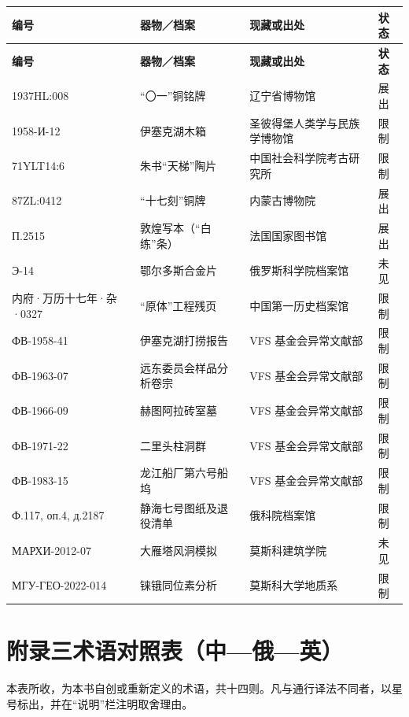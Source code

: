 \vspace{2mm}
{\footnotesize
\renewcommand{\arraystretch}{1.0}
\begin{longtable}{@{}p{27mm}p{40mm}p{36mm}p{24mm}@{}}
\toprule
\textbf{编号} & \textbf{器物／档案} & \textbf{现藏或出处} & \textbf{状态}\\
\midrule
\endfirsthead
\toprule
\textbf{编号} & \textbf{器物／档案} & \textbf{现藏或出处} & \textbf{状态}\\
\midrule
\endhead
\bottomrule
\endfoot
1937HL:008 & “〇一”铜铭牌 & 辽宁省博物馆 & 展出\\
1958-И-12 & 伊塞克湖木箱 & 圣彼得堡人类学与民族学博物馆 & 限制\\
71YLT14:6 & 朱书“天梯”陶片 & 中国社会科学院考古研究所 & 限制\\
87ZL:0412 & “十七刻”铜牌 & 内蒙古博物院 & 展出\\
П.2515 & 敦煌写本（“白练”条） & 法国国家图书馆 & 展出\\
Э-14 & 鄂尔多斯合金片 & 俄罗斯科学院档案馆 & 未见\\
内府·万历十七年·杂·0327 & “原体”工程残页 & 中国第一历史档案馆 & 限制\\
ФВ-1958-41 & 伊塞克湖打捞报告 & VFS 基金会异常文献部 & 限制\\
ФВ-1963-07 & 远东委员会样品分析卷宗 & VFS 基金会异常文献部 & 限制\\
ФВ-1966-09 & 赫图阿拉砖室墓 & VFS 基金会异常文献部 & 限制\\
ФВ-1971-22 & 二里头柱洞群 & VFS 基金会异常文献部 & 限制\\
ФВ-1983-15 & 龙江船厂第六号船坞 & VFS 基金会异常文献部 & 限制\\
Ф.117, оп.4, д.2187 & 静海七号图纸及退役清单 & 俄科院档案馆 & 限制\\
МАРХИ-2012-07 & 大雁塔风洞模拟 & 莫斯科建筑学院 & 未见\\
МГУ-ГЕО-2022-014 & 铼锇同位素分析 & 莫斯科大学地质系 & 限制\\
\bottomrule
\end{longtable}
}

\clearpage
\chapter*{附录三\quad 术语对照表（中—俄—英）}

\noindent
本表所收，为本书自创或重新定义的术语，共十四则。凡与通行译法不同者，以星号标出，并在“说明”栏注明取舍理由。


